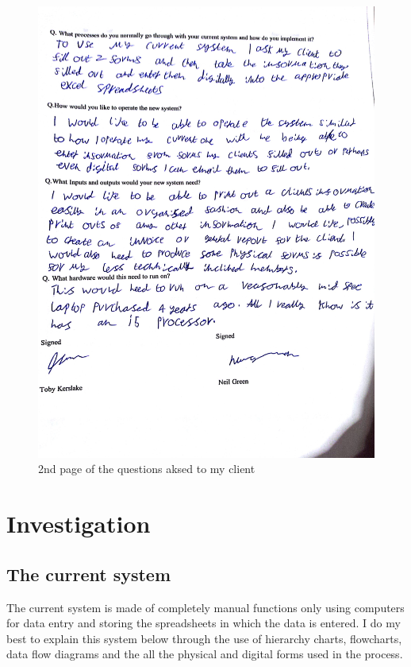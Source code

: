 \begin{figure}[H]
    \includegraphics[width=\textwidth]{Questionaire 2.jpg}
    \caption{2nd page of the questions aksed to my client} \label{fig:2nd page of the questions aksed to my client}
\end{figure}
\section{Investigation}

\subsection{The current system}

The current system is made of completely manual functions only using computers for data entry and storing the spreadsheets in which the data is entered. I do my best to explain this system below through the use of hierarchy charts, flowcharts, data flow diagrams and the all the physical and digital forms used in the process.

